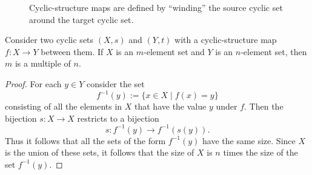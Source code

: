 \begin{figure}[t]
  \centering
  \caption[Cyclic-structure maps]{Cyclic-structure maps are defined by ``winding'' the source cyclic set around the target cyclic set.}
  \label{figure:cyclic-structure-maps}
\end{figure}

\begin{theorem}
  Consider two cyclic sets $(X,s)$ and $(Y,t)$ with a cyclic-structure map $f:X\to Y$ between them. If $X$ is an $m$-element set and $Y$ is an $n$-element set, then $m$ is a multiple of $n$.
\end{theorem}

\begin{proof}
  For each $y\in Y$ consider the set
  \begin{equation*}
    f^{-1}(y) := \{x\in X\mid f(x)=y\}
  \end{equation*}
  consisting of all the elements in $X$ that have the value $y$ under $f$. Then the bijection $s:X\to X$ restricts to a bijection
  \begin{equation*}
    s : f^{-1}(y) \to f^{-1}(s(y)).
  \end{equation*}
  Thus it follows that all the sets of the form $f^{-1}(y)$ have the same size. Since $X$ is the union of these sets, it follows that the size of $X$ is $n$ times the size of the set $f^{-1}(y)$.
\end{proof}

